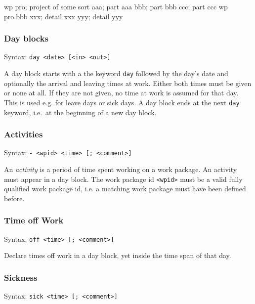 \documentclass[11pt]{article}
\begin{document}
\begin{inputfile}
wp pro; project of some sort
    aaa; part aaa
    bbb; part bbb
    ccc; part ccc
wp pro.bbb
    xxx; detail xxx
    yyy; detail yyy
\end{inputfile}

\subsubsection{Day blocks}

Syntax: \verb:day <date> [<in> <out>]:

A day block starts with a the keyword \verb:day: followed by the day's date and optionally the arrival and leaving times at work. Either both times must be given or none at all. If they are not given, no time at work is assumed for that day. This is used e.g. for leave days or sick days. A day block ends at the next \verb:day: keyword, i.e.\ at the beginning of a new day block.


\subsubsection{Activities}

Syntax: \verb:- <wpid> <time> [; <comment>]:

An \emph{activity} is a period of time spent working on a work package. An activity must appear in a day block. The work package id \verb:<wpid>: must be a valid fully qualified work package id, i.e. a matching work package must have been defined before.

\subsubsection{Time off Work}

Syntax: \verb:off <time> [; <comment>]:

Declare times off work in a day block, yet inside the time span of that day.
 
\subsubsection{Sickness}

Syntax: \verb:sick <time> [; <comment>]:
\end{document}
